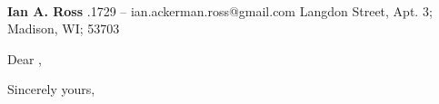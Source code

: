 \documentclass[11pt]{letter} %
\begin{document}

\begin{letter}{\recip\\
\recipaddr}


\begin{center}
    {\Large\bf Ian A. Ross} %
    \smallskip{}.1729 -- ian.ackerman.ross@gmail.com
    \smallskip{} Langdon Street, Apt. 3; Madison, WI; 53703
\end{center} 

\signature{Ian Ross} %



\opening{Dear \recip,} 
 
\lipsum[1]

\lipsum[17]
 
\lipsum[137]

\closing{Sincerely yours,}




\end{letter}
\end{document}
